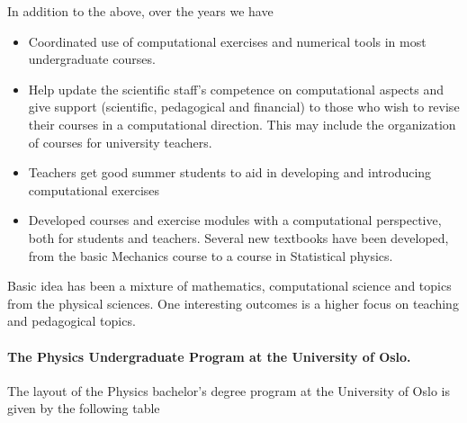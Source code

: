 \documentclass[graybox,envcountchap,sectrefs]{svmult}
\begin{document}
In addition to the above, over the years we have 
\begin{itemize}
\item Coordinated use of computational exercises and numerical tools in most undergraduate courses.

\item Help update the scientific staff's competence on computational aspects and give support (scientific, pedagogical and financial)  to those who wish to revise  their courses in a computational direction. This may include the organization of courses for university teachers.

\item Teachers get good summer students to aid in developing and introducing computational exercises

\item Developed courses and exercise modules with a computational perspective, both for students and teachers. Several new textbooks have been developed, from the basic Mechanics course to a course in Statistical physics. 
\end{itemize}

\noindent
Basic idea has been a  mixture of mathematics, computational science and topics from the physical sciences. One interesting outcomes is a
higher focus on teaching and pedagogical topics. 

\paragraph{The Physics Undergraduate Program at the University of Oslo.}
The layout of the Physics bachelor's degree program at the University of Oslo is given by the following table
\end{document}
